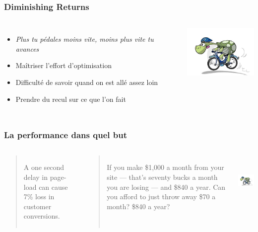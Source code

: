 \documentclass{beamer}
\begin{document}
\begin{frame}
  \frametitle{Diminishing Returns}

  \vfill

\begin{columns}[c]

  \begin{itemize}
  \item \textit{Plus tu pédales moins vite, moins plus vite tu avances}
  \item Maîtriser l'effort d'optimisation
  \item Difficulté de savoir quand on est allé assez loin
  \item Prendre du recul sur ce que l'on fait
  \end{itemize}

\begin{center}
  \includegraphics[height=7em]{cartoon-velo.jpg}
\end{center}
\end{columns}
\end{frame}

\begin{frame}
  \frametitle{La performance dans quel but}

  \vfill

\begin{columns}[c]

\begin{quote}
A one second delay in page-load can cause 7\% loss in customer conversions.
\end{quote}

\begin{quotation}
If you make \$1,000 a month from your site — that’s seventy bucks a month
you are losing — and \$840 a year. Can you afford to just throw away \$70 a
month? \$840 a year?
\end{quotation}

\begin{center}
  \includegraphics[height=7em]{cartoon-velo.jpg}
\end{center}
\end{columns}
\end{frame}
\end{document}
